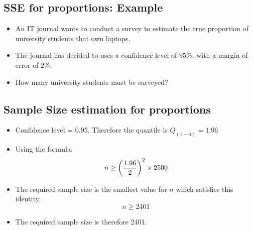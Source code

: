 \documentclass[]{report}
\begin{document}
\subsection{SSE for proportions: Example}
\begin{itemize}
\item An IT journal wants to conduct a survey to estimate the true proportion of university students that own laptops.
\item The journal has decided to uses a confidence level of $95\%$, with a margin of error of $2\%$.
\item How many university students must be surveyed?
\end{itemize}



\subsection{Sample Size estimation for proportions}

\begin{itemize}
\item Confidence level = 0.95. Therefore the quantile is $Q_{(1-\alpha)} = 1.96$
\item Using the formula: \[ n \geq \left({1.96 \over 2 }\right)^2 \times 2500  \]
\item The required sample size is the smallest value for $n$ which satisfies this identity: \[ n \geq 2401  \]
\item The required sample size is therefore 2401.
\end{itemize}
\end{document}
